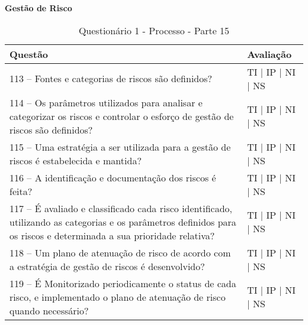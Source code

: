 \documentclass[openany,10pt,a4paper]{article}
\begin{document}
\begin{appendix}
\begin{table}[h]
\textbf{Gestão de Risco}
	\centering
	\caption{Questionário 1 - Processo - Parte 15}
	\begin{tabular}{p{3.5in}p{2in}}		
		\toprule
		\textbf{Questão}  & \textbf{Avaliação}\\ 
		\midrule
		113 – Fontes e categorias de riscos são definidos?
 & TI | IP | NI | NS \\
        \midrule
		114 – Os parâmetros utilizados para analisar e categorizar os riscos e controlar o esforço de 
gestão de riscos são definidos?
 & TI | IP | NI | NS \\
		\midrule
		115 – Uma estratégia a ser utilizada para a gestão de riscos é estabelecida e mantida?
 & TI | IP | NI | NS \\
		\midrule
        116 – A identificação e documentação dos riscos é feita?
 & TI | IP | NI | NS \\
		\midrule
	117 – É avaliado e classificado cada risco identificado, utilizando as categorias e os parâmetros 
definidos para os riscos e determinada a sua prioridade relativa?
  & TI | IP | NI | NS \\
		\midrule
		118 – Um plano de atenuação de risco de acordo com a estratégia de gestão de riscos é 
desenvolvido?
 & TI | IP | NI | NS \\
 \midrule
		119 – É Monitorizado periodicamente o status de cada risco, e implementado o plano de 
atenuação de risco quando necessário?
 & TI | IP | NI | NS \\
		\bottomrule
	\end{tabular} 
	\label{tab:tabela1}
\end{table}


\end{appendix}
\end{document}
